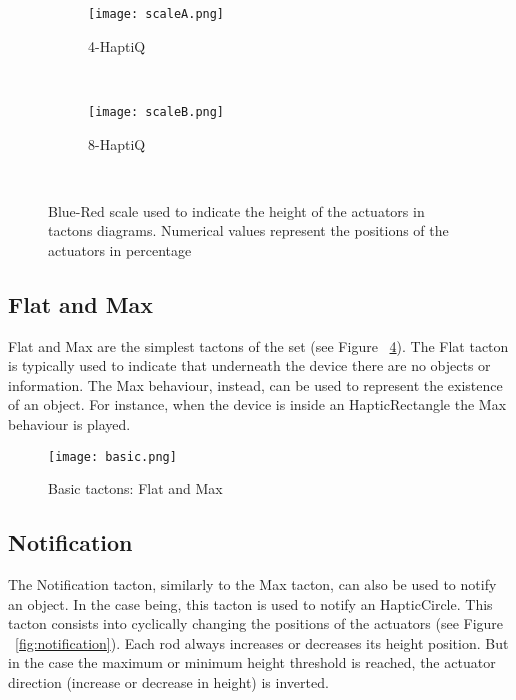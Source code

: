 \begin{figure}[H]
        \centering
        \begin{subfigure}[H]{0.7\textwidth}
                \texttt{[image: scaleA.png]}
                \caption{4-HaptiQ}
                \label{fig:scale-4}
        \end{subfigure}%
        ~ %
          
        \begin{subfigure}[H]{0.7\textwidth}
                \texttt{[image: scaleB.png]}
                \caption{8-HaptiQ}
                \label{fig:scale-8}
        \end{subfigure}
        ~ %
        \caption{Blue-Red scale used to indicate the height of the actuators in tactons diagrams. Numerical values represent the positions of the actuators in percentage}
        \label{fig:scales}
\end{figure}

\subsection{Flat and Max}

Flat and Max are the simplest tactons of the set (see Figure ~\ref{fig:Basictactons}). The Flat tacton is typically used to indicate that underneath the device there are no objects or information. The Max behaviour, instead, can be used to represent the existence of an object. For instance, when the device is inside an HapticRectangle the Max behaviour is played. 

\begin{figure}[H]
  \centering
  \texttt{[image: basic.png]}
  \caption{Basic tactons: Flat and Max}
  \label{fig:Basictactons}
\end{figure}

\subsection{Notification}
\label{sec:notification}

The Notification tacton, similarly to the Max tacton, can also be used to notify an object. In the case being, this tacton is used to notify an HapticCircle. This tacton consists into cyclically changing the positions of the actuators (see Figure ~\ref{fig:notification}). Each rod always increases or decreases its height position. But in the case the maximum or minimum height threshold is reached, the actuator direction (increase or decrease in height) is inverted.

